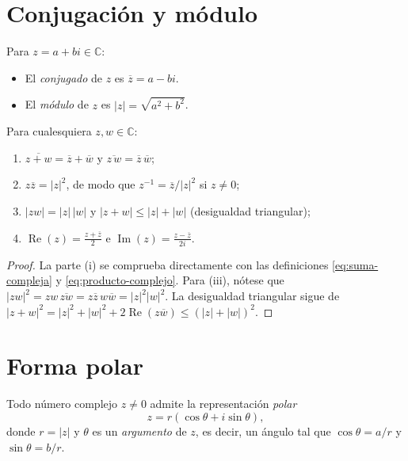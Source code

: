 \section{Conjugación y módulo}

\begin{definition}
\label{def:conjugado-modulo}
Para $z=a+bi\in\mathbb{C}$:
\begin{itemize}
  \item El \emph{conjugado} de $z$ es $\overline{z}=a-bi$.
  \item El \emph{módulo} de $z$ es $|z|=\sqrt{a^2+b^2}$.
\end{itemize}
\end{definition}

\begin{theorem}
\label{teo:prop-conjugacion}
Para cualesquiera $z,w\in\mathbb{C}$:
\begin{enumerate}
  \item[(i)] $\overline{z+w}=\overline{z}+\overline{w}$ y $\overline{z\,w}=\overline{z}\,\overline{w}$;
  \item[(ii)] $z\overline{z}=|z|^2$, de modo que $z^{-1}=\overline{z}/|z|^2$ si $z\neq 0$;
  \item[(iii)] $|zw|=|z|\,|w|$ y $|z+w|\leq|z|+|w|$ (desigualdad triangular);
  \item[(iv)] $\operatorname{Re}(z)=\frac{z+\overline{z}}{2}$ e $\operatorname{Im}(z)=\frac{z-\overline{z}}{2i}$.
\end{enumerate}
\end{theorem}

\begin{proof}
La parte (i) se comprueba directamente con las definiciones \eqref{eq:suma-compleja} y \eqref{eq:producto-complejo}. Para (iii), nótese que $|zw|^2=zw\,\overline{zw}=z\overline{z}\,w\overline{w}=|z|^2|w|^2$. La desigualdad triangular sigue de $|z+w|^2=|z|^2+|w|^2+2\operatorname{Re}(z\overline{w})\leq(|z|+|w|)^2$.
\end{proof}

\section{Forma polar}

\begin{definition}
\label{def:forma-polar}
Todo número complejo $z\neq 0$ admite la representación \emph{polar}
\[
  z=r(\cos\theta+i\sin\theta),
\]
donde $r=|z|$ y $\theta$ es un \emph{argumento} de $z$, es decir, un ángulo tal que $\cos\theta=a/r$ y $\sin\theta=b/r$.
\end{definition}

